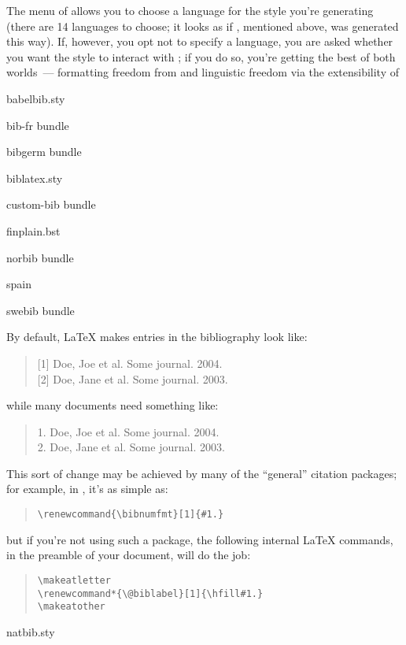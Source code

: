 The  menu of  allows you to
choose a language for the \BibTeX{} style you're generating (there are
14 languages to choose; it looks as if , mentioned
above, was generated this way).  If, however, you opt not to specify a
language, you are asked whether you want the style to interact with
; if you do so, you're getting the best of both
worlds~--- formatting freedom from  and linguistic
freedom via the extensibility of 
\begin{ctanrefs}
\item[babelbib.sty]
\item[bib-fr \nothtml{\rmfamily\upshape}bundle]
\item[bibgerm \nothtml{\rmfamily\upshape}bundle]
\item[biblatex.sty]
\item[custom-bib \nothtml{\rmfamily\upshape}bundle]
\item[finplain.bst]
\item[norbib \nothtml{\rmfamily\upshape}bundle]
\item[spain]
\item[swebib \nothtml{\rmfamily\upshape}bundle]
\end{ctanrefs}


By default, \LaTeX{} makes entries in the bibliography look like:
\begin{quote}
  [1] Doe, Joe et al.  Some journal.  2004.\\
  {[2]} Doe, Jane et al. Some journal. 2003.
\end{quote}
while many documents need something like:
\begin{quote}
  1. Doe, Joe et al.  Some journal.  2004.\\
  2. Doe, Jane et al. Some journal. 2003.
\end{quote}

This sort of change may be achieved by many of the ``general''
citation packages; for example, in , it's as simple as:
\begin{quote}
\begin{verbatim}
\renewcommand{\bibnumfmt}[1]{#1.}
\end{verbatim}
\end{quote}
but if you're not using such a package, the following internal
\LaTeX{} commands, in the preamble of your document, will do the job:
\begin{quote}
\begin{verbatim}
\makeatletter
\renewcommand*{\@biblabel}[1]{\hfill#1.}
\makeatother
\end{verbatim}
\end{quote}
\begin{ctanrefs}
\item[natbib.sty]
\end{ctanrefs}

